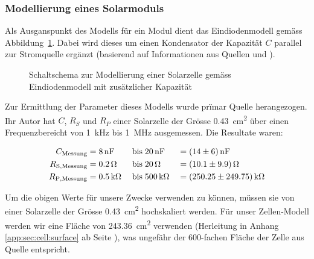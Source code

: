 \subsubsection{Modellierung eines Solarmoduls}
\label{subsubsec:hw:ask:modell}

Als    Ausganspunkt    des    Modells    f\"ur    ein    Modul    dient    das
Eindiodenmodell          gem\"ass
Abbildung~\ref{fig:circuit:solarCell}. Dabei    wird     dieses    um    einen
Kondensator   der  Kapazit\"at   $C$   parallel   zur  Stromquelle   erg\"anzt
(basierend  auf   Informationen  aus  Quellen   \cite{ref:solar:scofield}  und
\cite{ref:solar:friesen}).

\begin{figure}[h!tb]
    \centering
    
    \caption{%
        Schaltschema    zur    Modellierung    einer    Solarzelle    gem\"ass
        Eindiodenmodell mit zus\"atzlicher Kapazit\"at%
    }
    \label{fig:circuit:solarCell}
\end{figure}

Zur   Ermittlung  der   Parameter   dieses  Modells   wurde  pr\"imar   Quelle
\cite{ref:solar:scofield}  herangezogen. Ihr   Autor  hat  $C$,   $R_{S}$  und
$R_{P}$ einer  Solarzelle der Gr\"osse  \SI{0.43}{\centi\meter\squared} \"uber
einen   Frequenzbereicht  von   \SI{1}{\kilo\hertz}  bis   \SI{1}{\mega\hertz}
ausgemessen. Die Resultate waren:

\begin{alignat}{3}
    \label{eq:scofield:C}
    C_{\mathrm{Messung}}    &= \SI{8}{\nano\farad} \; & \text{bis} \; & \SI{20}{\nano\farad} \;  & = & \; \SI{14 \pm 6}{\nano\farad} \\
    \label{eq:scofield:Rs}
    R_{\mathrm{S, Messung}} &= \SI{0.2}{\ohm}      \; & \text{bis} \; & \SI{20}{\ohm}        \;  & = & \; \SI{10.1 \pm 9.9}{\ohm}     \\
    \label{eq:scofield:Rp}
    R_{\mathrm{P, Messung}} &= \SI{0.5}{\kilo\ohm} \; & \text{bis} \; & \SI{500}{\kilo\ohm}  \;  & = & \; \SI{250.25 \pm 249.75}{\kilo\ohm}
\end{alignat}

Um  die obigen  Werte  f\"ur  unsere Zwecke  verwenden  zu k\"onnen,  m\"ussen
sie   von  einer   Solarzelle  der   Gr\"osse  \SI{0.43}{\centi\meter\squared}
hochskaliert    werden. F\"ur   unser    Zellen-Modell    werden   wir    eine
Fl\"ache  von   \SI{243.36}{\centi\meter\squared}  verwenden   (Herleitung  in
Anhang  \ref{app:sec:cell:surface}  ab Seite  \pageref{app:sec:cell:surface}),
was   ungef\"ahr    der   600-fachen    Fl\"ache   der   Zelle    aus   Quelle
\cite{ref:solar:scofield} entspricht.

